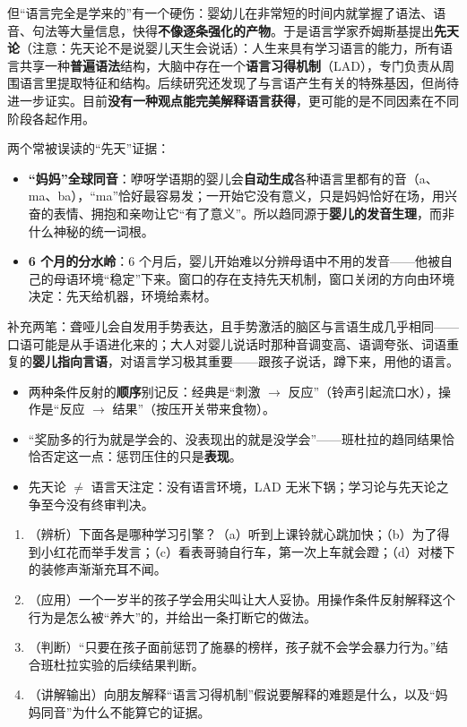 \documentclass[UTF8,a4paper,11pt]{ctexart}
\begin{document}
但“语言完全是学来的”有一个硬伤：婴幼儿在非常短的时间内就掌握了语法、语音、句法等大量信息，快得\textbf{不像逐条强化的产物}。于是语言学家乔姆斯基提出\textbf{先天论}（注意：先天论不是说婴儿天生会说话）：人生来具有学习语言的能力，所有语言共享一种\textbf{普遍语法}结构，大脑中存在一个\textbf{语言习得机制}（LAD），专门负责从周围语言里提取特征和结构。后续研究还发现了与言语产生有关的特殊基因，但尚待进一步证实。目前\textbf{没有一种观点能完美解释语言获得}，更可能的是不同因素在不同阶段各起作用。

两个常被误读的“先天”证据：
\begin{itemize}
  \item \textbf{“妈妈”全球同音}：咿呀学语期的婴儿会\textbf{自动生成}各种语言里都有的音（a、ma、ba），“ma”恰好最容易发；一开始它没有意义，只是妈妈恰好在场，用兴奋的表情、拥抱和亲吻让它“有了意义”。所以趋同源于\textbf{婴儿的发音生理}，而非什么神秘的统一词根。
  \item \textbf{6 个月的分水岭}：6 个月后，婴儿开始难以分辨母语中不用的发音——他被自己的母语环境“稳定”下来。窗口的存在支持先天机制，窗口关闭的方向由环境决定：先天给机器，环境给素材。
\end{itemize}

补充两笔：聋哑儿会自发用手势表达，且手势激活的脑区与言语生成几乎相同——口语可能是从手语进化来的；大人对婴儿说话时那种音调变高、语调夸张、词语重复的\textbf{婴儿指向言语}，对语言学习极其重要——跟孩子说话，蹲下来，用他的语言。

\begin{keyconcept}[易错点与失效边界]
\begin{itemize}
  \item 两种条件反射的\textbf{顺序}别记反：经典是“刺激 $\rightarrow$ 反应”（铃声引起流口水），操作是“反应 $\rightarrow$ 结果”（按压开关带来食物）。
  \item “奖励多的行为就是学会的、没表现出的就是没学会”——班杜拉的趋同结果恰恰否定这一点：惩罚压住的只是\textbf{表现}。
  \item 先天论 $\neq$ 语言天注定：没有语言环境，LAD 无米下锅；学习论与先天论之争至今没有终审判决。
\end{itemize}
\end{keyconcept}

\begin{exercise}[今日自测]
\begin{enumerate}
  \item （辨析）下面各是哪种学习引擎？（a）听到上课铃就心跳加快；（b）为了得到小红花而举手发言；（c）看表哥骑自行车，第一次上车就会蹬；（d）对楼下的装修声渐渐充耳不闻。
  \item （应用）一个一岁半的孩子学会用尖叫让大人妥协。用操作条件反射解释这个行为是怎么被“养大”的，并给出一条打断它的做法。
  \item （判断）“只要在孩子面前惩罚了施暴的榜样，孩子就不会学会暴力行为。”结合班杜拉实验的后续结果判断。
  \item （讲解输出）向朋友解释“语言习得机制”假说要解释的难题是什么，以及“妈妈同音”为什么不能算它的证据。
\end{enumerate}
\end{exercise}
\end{document}
